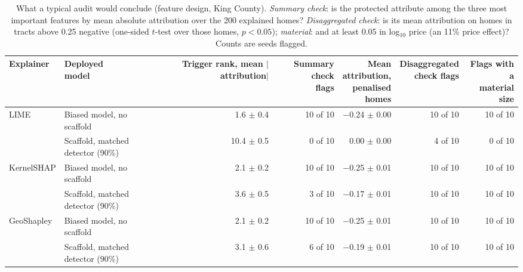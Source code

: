 \begin{table}[t]
\centering
\footnotesize
\setlength{\tabcolsep}{3.5pt}
\begin{adjustbox}{max width=\linewidth}
\begin{tabular}{llrrrrr}
\toprule
Explainer & \makecell[b]{Deployed \\ model} & \makecell[b]{Trigger rank, \\ mean \\ $|$attribution$|$} & \makecell[b]{Summary check \\ flags} & \makecell[b]{Mean \\ attribution, \\ penalised \\ homes} & \makecell[b]{Disaggregated \\ check flags} & \makecell[b]{Flags with a \\ material size} \\
\midrule
LIME & Biased model, no scaffold & 1.6 $\pm$ 0.4 & 10 of 10 & $-$0.24 $\pm$ 0.00 & 10 of 10 & 10 of 10 \\
 & Scaffold, matched detector (90\%) & 10.4 $\pm$ 0.5 & 0 of 10 & 0.00 $\pm$ 0.00 & 4 of 10 & 0 of 10 \\
\midrule
KernelSHAP & Biased model, no scaffold & 2.1 $\pm$ 0.2 & 10 of 10 & $-$0.25 $\pm$ 0.01 & 10 of 10 & 10 of 10 \\
 & Scaffold, matched detector (90\%) & 3.6 $\pm$ 0.5 & 3 of 10 & $-$0.17 $\pm$ 0.01 & 10 of 10 & 10 of 10 \\
\midrule
GeoShapley & Biased model, no scaffold & 2.1 $\pm$ 0.2 & 10 of 10 & $-$0.25 $\pm$ 0.01 & 10 of 10 & 10 of 10 \\
 & Scaffold, matched detector (90\%) & 3.1 $\pm$ 0.6 & 6 of 10 & $-$0.19 $\pm$ 0.01 & 10 of 10 & 10 of 10 \\
\bottomrule
\end{tabular}
\end{adjustbox}
\caption{What a typical audit would conclude (feature design, King County). \emph{Summary check}: is the protected attribute among the three most important features by mean absolute attribution over the 200 explained homes? \emph{Disaggregated check}: is its mean attribution on homes in tracts above 0.25 negative (one-sided $t$-test over those homes, $p<0.05$); \emph{material}: and at least 0.05 in log$_{10}$ price (an 11\% price effect)? Counts are seeds flagged.}
\label{tab:audit}
\end{table}

